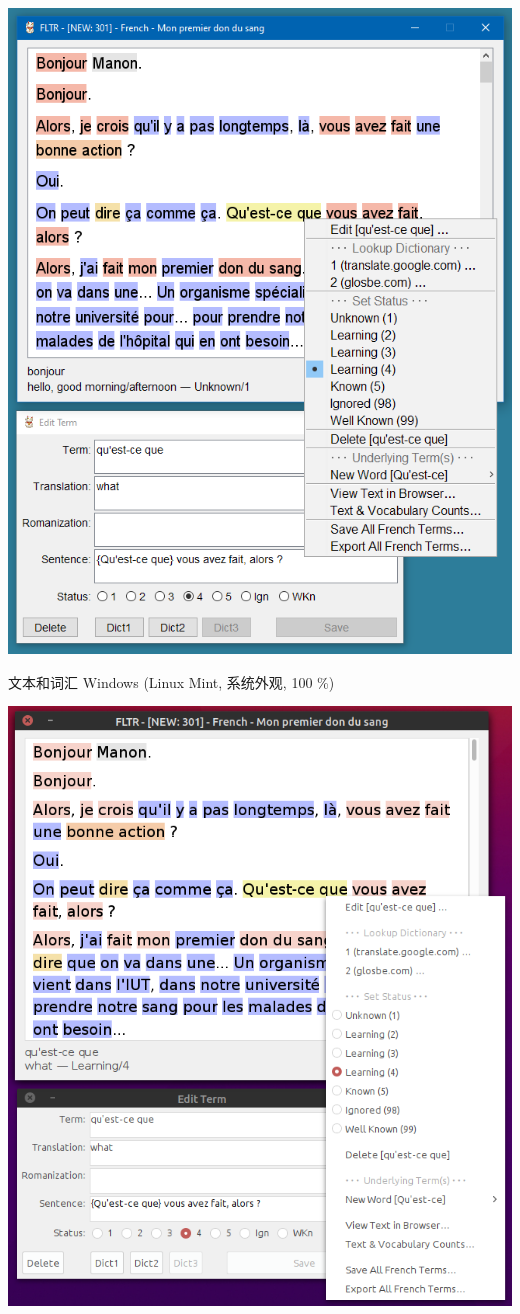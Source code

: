 \documentclass[cn,10pt,math=newtx,citestyle=gb7714-2015,bibstyle=gb7714-2015]{elegantbook}
\begin{document}
\includegraphics[scale=0.5]{image/images-012.png}


文本和词汇 Windows (Linux Mint, 系统外观, 100 \%)

\includegraphics[scale=0.5]{image/images-013.png}
\end{document}
